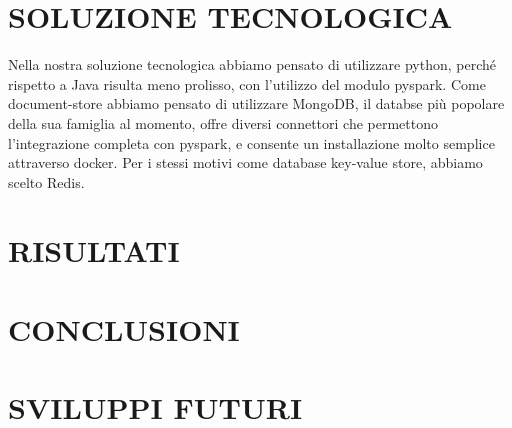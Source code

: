 \documentclass[10pt,a4paper,onecolumn]{article}
\begin{document}
\section{SOLUZIONE TECNOLOGICA}

Nella nostra soluzione tecnologica abbiamo pensato di utilizzare python, perché rispetto a Java risulta meno prolisso, con l'utilizzo del modulo pyspark.\newline
Come document-store abbiamo pensato di utilizzare MongoDB, il databse più popolare della sua famiglia al momento, offre diversi connettori che permettono l'integrazione completa con pyspark, e consente un installazione molto semplice attraverso docker.\newline
Per i stessi motivi come database key-value store, abbiamo scelto Redis.

\section{RISULTATI}
\section{CONCLUSIONI}

\section{SVILUPPI FUTURI}
\end{document}
